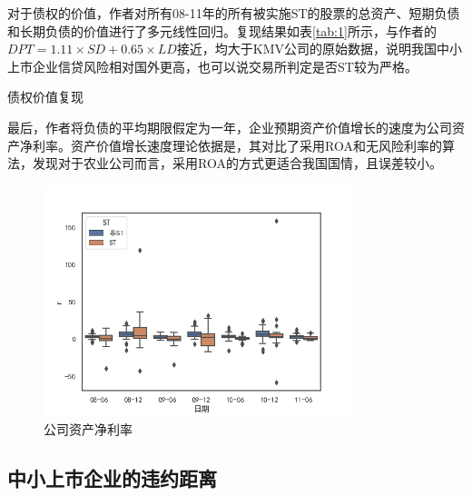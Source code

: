 \documentclass[a4paper,12pt]{ctexart}
\begin{document}
对于债权的价值，作者对所有08-11年的所有被实施ST的股票的总资产、短期负债和长期负债的价值进行了多元线性回归。复现结果如表\ref{tab:1}所示，与作者的$DPT = 1.11\times SD+0.65\times LD$接近，均大于KMV公司的原始数据，说明我国中小上市企业信贷风险相对国外更高，也可以说交易所判定是否ST较为严格。
\begin{table}[H]
    \small
    \caption{债权价值复现}\label{tab:1}
\end{table}

最后，作者将负债的平均期限假定为一年，企业预期资产价值增长的速度为公司资产净利率。资产价值增长速度理论依据是\citet{夏红芳2007基于}，其对比了采用ROA和无风险利率的算法，发现对于农业公司而言，采用ROA的方式更适合我国国情，且误差较小。
\begin{figure}[H]
    \centering
    \includegraphics[width=0.8\textwidth]{img/r.png}
    \caption{公司资产净利率}
\end{figure}
\subsection{中小上市企业的违约距离}
\end{document}
